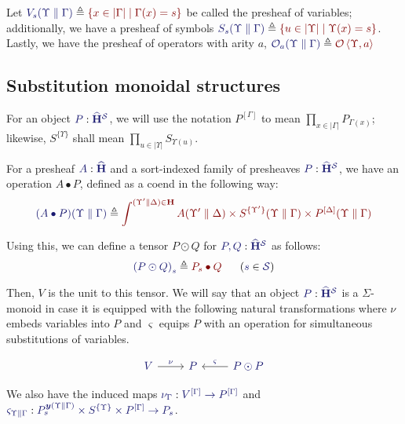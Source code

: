 \documentclass[11pt]{article}
\theoremstyle{definition}
\theoremstyle{remark}
\numberwithin{equation}{section}
\def\IModeColorName{MidnightBlue}
\def\OModeColorName{Maroon}
\newcommand\IMode[1]{{\color{\IModeColorName}{#1}}}
\newcommand\OMode[1]{{\color{\OModeColorName}{#1}}}
\newcommand\HypJ[2]{#1\ \ (#2)}
\newcommand\MkSet[1]{\left\{#1\right\}}
\newcommand\Member[2]{\IMode{#1}\in\IMode{#2}}
\newcommand\Of[2]{\IMode{#1}: \IMode{#2}}
\newcommand\Sorts{\mathcal{S}}
\newcommand\Operators{\mathcal{O}}
\newcommand\HypCat{\mathbf{H}}
\newcommand\Pair[2]{\left\langle#1, #2 \right\rangle}
\newcommand\Dom[1]{\left\vert#1\right\vert}
\newcommand\Define[2]{\IMode{#1}\triangleq\OMode{#2}}
\newcommand\Yoneda[1]{\boldsymbol{y} (#1)}
\begin{document}
Let $\Define{V_s(\Upsilon\parallel\Gamma)}{\MkSet{x\in\Dom\Gamma\mid
\Gamma(x)=s}}$ be called the presheaf of variables; additionally, we have a
presheaf of symbols
$\Define{S_s(\Upsilon\parallel\Gamma)}{\MkSet{u\in\Dom\Upsilon\mid
\Upsilon(x)=s}}$. Lastly, we have the presheaf of operators with arity $a$,
$\Define{\Operators_a(\Upsilon\parallel\Gamma)}{\Operators\Pair{\Upsilon}{a}}$

\subsection{Substitution monoidal structures}

For an object $\Of{P}{\widehat{\HypCat}^\Sorts}$, we will use the notation
$P^{[\Gamma]}$ to mean $\prod_{x\in\Dom\Gamma}P_{\Gamma(x)}$; likewise,
$S^{\{\Upsilon\}}$ shall mean $\prod_{u\in\Dom\Upsilon}S_{\Upsilon(u)}$.

For a presheaf $\Of{A}{\widehat{\HypCat}}$ and a sort-indexed family of
presheaves $\Of{P}{\widehat{\HypCat}^\Sorts}$, we have an operation $A\bullet
P$, defined as a coend in the following way:
\[
  \Define{(A\bullet P)(\Upsilon\parallel\Gamma)}{
    \int^{(\Upsilon'\parallel\Delta)\in\HypCat}
      A(\Upsilon'\parallel\Delta)
      \times S^{\{\Upsilon'\}}(\Upsilon\parallel\Gamma)
      \times P^{[\Delta]}(\Upsilon\parallel\Gamma)
  }
\]

Using this, we can define a tensor $P\odot Q$ for
$\Of{P,Q}{\widehat{\HypCat}^\Sorts}$ as follows:
\[
  \HypJ{
    \Define{{(P\odot Q)}_{s}}{
      P_s\bullet Q
    }
    \quad
  }{
    \Member{s}{\Sorts}
  }
\]

Then, $V$ is the unit to this tensor. We will say that an object
$\Of{P}{\widehat{\HypCat}^\Sorts}$ is a $\Sigma$-monoid in case it is equipped
with the following natural transformations where $\nu$ embeds variables into
$P$ and $\varsigma$ equips $P$ with an operation for simultaneous substitutions
of variables.

\[
  \begin{tikzcd}[ampersand replacement = \&]
    {\IMode{V}} \arrow[r, "\IMode\nu"]
    \& {\IMode{P}}
    \& {\IMode{P\odot P}}
    \arrow[l, "\IMode\varsigma", swap]
  \end{tikzcd}
\]

We also have the induced maps $\Of{\nu_\Gamma}{V^{[\Gamma]}\to P^{[\Gamma]}}$
and
$\Of{\varsigma_{\Upsilon\parallel\Gamma}}{P_s^{\Yoneda{\Upsilon\parallel\Gamma}} \times
S^{\{\Upsilon\}}\times P^{[\Gamma]}\to P_s}$.
\end{document}
